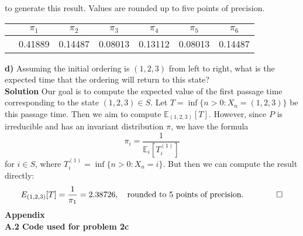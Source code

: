 \documentclass[11pt, letterpaper]{article}
\newcommand{\mbb}[1]{\mathbb{#1}}
\begin{document}
    to generate this result. Values are rounded up to five points of precision.
    \begin{center}
        \begin{tabular}{@{}lc|c|c|c|c|c@{}}\toprule
                & $\pi_1$ & $\pi_2$ & $\pi_3$ & $\pi_4$ & $\pi_5$ & $\pi_6$\\
                \midrule
                &0.41889 & 0.14487 & 0.08013 & 0.13112 & 0.08013 & 0.14487\\
            \bottomrule
        \end{tabular}
    \end{center}
    {\bf d)} Assuming the initial ordering is $(1,2,3)$ from left to right, what is the expected time that the ordering will return to this state?\\[10pt]
    {\bf Solution} Our goal is to compute the expected value of the first passage time corresponding to the state $(1,2,3)\in S$. Let $T=\inf\{n>0:X_n=(1,2,3)\}$ be this passage time. 
    Then we aim to compute $\mbb{E}_{(1,2,3)}[T]$. However, since $P$ is irreducible and has an invariant distribution $\pi$, we have the formula
    \[\pi_i=\frac{1}{\mbb{E}_i[T_i^{(1)}]}\]
    for $i\in S$, where $T_i^{(1)}=\inf\{n>0:X_n=i\}$. But then we can compute the result directly:
    \[E_{(1,2,3)}[T]=\frac{1}{\pi_1}=2.38726,\quad\text{rounded to 5 points of precision.\tag*{$\qed$}}\]
    {\bf\Large Appendix}\\[10pt]
    {\bf A.2 Code used for problem 2c}
\end{document}
